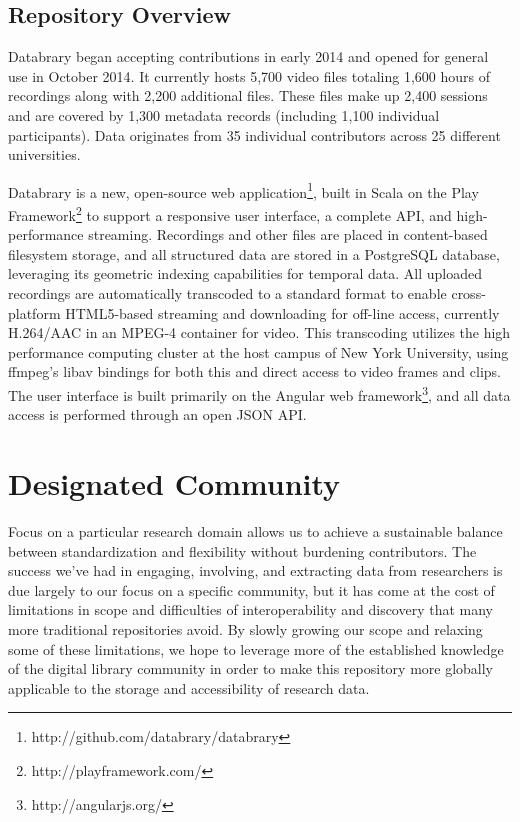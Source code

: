 \documentclass{sig-alternate}
\begin{document}
\subsection*{Repository Overview}
Databrary began accepting contributions in early 2014 and opened for general use in October 2014.
It currently hosts 5,700 video files totaling 1,600 hours of recordings along with 2,200 additional files.
These files make up 2,400 sessions and are covered by 1,300 metadata records (including 1,100 individual participants).
Data originates from 35 individual contributors across 25 different universities.

Databrary is a new, open-source web application\footnote{http://github.com/databrary/databrary}, built in Scala on the Play Framework\footnote{http://playframework.com/} to support a responsive user interface, a complete API, and high-performance streaming.
Recordings and other files are placed in content-based filesystem storage, and all structured data are stored in a PostgreSQL database, leveraging its geometric indexing capabilities for temporal data.
All uploaded recordings are automatically transcoded to a standard format to enable cross-platform HTML5-based streaming and downloading for off-line access, currently H.264/AAC in an MPEG-4 container for video.
This transcoding utilizes the high performance computing cluster at the host campus of New York University, using ffmpeg's libav bindings for both this and direct access to video frames and clips.
The user interface is built primarily on the Angular web framework\footnote{http://angularjs.org/}, and all data access is performed through an open JSON API.

\section{Designated Community}

Focus on a particular research domain allows us to achieve a sustainable balance between standardization and flexibility without burdening contributors.
The success we've had in engaging, involving, and extracting data from researchers is due largely to our focus on a specific community, but it has come at the cost of limitations in scope and difficulties of interoperability and discovery that many more traditional repositories avoid.
By slowly growing our scope and relaxing some of these limitations, we hope to leverage more of the established knowledge of the digital library community in order to make this repository more globally applicable to the storage and accessibility of research data.
\end{document}

